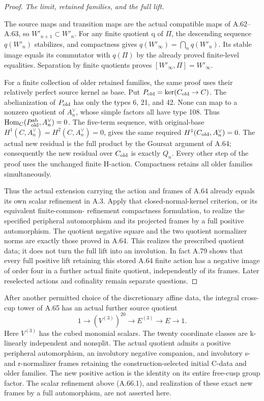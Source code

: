 \begin{proof}
\emph{The limit, retained families, and the full lift.}\par
The source maps and transition maps are the actual compatible maps
of A.62--A.63, so \(W'_{n+1}\subset W'_n\). For any finite quotient
q of \(\Pi\), the descending sequence \(q(W'_n)\) stabilizes, and
compactness gives
\(q(W'_\infty)=\bigcap_nq(W'_n)\). Its stable image equals its
commutator with \(q(\Pi)\) by the already proved finite-level
equalities. Separation by finite quotients proves
\([W'_\infty,\Pi]=W'_\infty\).

For a finite collection of older retained families, the same proof
uses their relatively perfect source kernel as base. Put
\(P_{\rm old}=\ker(C_{\rm old}\to C)\). The abelianization of
\(P_{\rm old}\) has only the types 6, 21, and 42. None can
map to a nonzero quotient of \(A_n^\vee\), whose simple factors
all have type 108. Thus
\(\operatorname{Hom}_C(P_{\rm old}^{\rm ab},A_n^\vee)=0\).
The five-term sequence, with original-base
\(H^1(C,A_n^\vee)=H^2(C,A_n^\vee)=0\), gives the same required
\(H^1(C_{\rm old},A_n^\vee)=0\). The actual new residual is the
full product by the Goursat argument of A.64; consequently the new
residual over \(C_{\rm old}\) is exactly \(Q_n\). Every other step of
the proof uses the unchanged finite H-action. Compactness retains
all older families simultaneously.

Thus the actual extension carrying the action and frames of A.64
already equals its own scalar refinement in A.3. Apply that
closed-normal-kernel criterion, or its equivalent finite-common-
refinement compactness formulation, to realize the specified
peripheral automorphism and its projected frames by a full positive
automorphism. The quotient negative square and the two quotient
normalizer norms are exactly those proved in A.64. This realizes
the prescribed quotient data; it does not turn the full lift into
an involution. In fact A.79 shows that every full positive lift
retaining this stored A.64 finite action has a negative image of
order four in a further actual finite quotient, independently of
its frames. Later reselected actions and cofinality remain separate
questions.
\end{proof}


After another permitted choice of the discretionary affine data, the
integral cross-cup tower of A.65 has an actual further source quotient
\[
 1\longrightarrow (V^{(3)})^{20}\longrightarrow E^{(3)}
 \longrightarrow E\longrightarrow1.
 \tag{A.66.1}
\]
Here \(V^{(3)}\) has the cubed monomial scalars. The twenty coordinate
classes are k-linearly independent and nonsplit. The actual quotient
admits a positive peripheral automorphism, an involutory negative
companion, and involutory s- and r-normalizer frames retaining the
construction-selected initial C-data and older families. The new
positive action is the identity on its entire free-cusp group factor.
The scalar refinement above (A.66.1), and realization of these exact
new frames by a full automorphism, are not asserted here.

